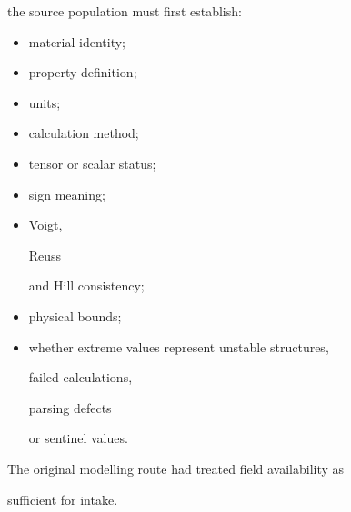 \documentclass[11pt,a4paper,oneside]{report}
\begin{document}
the source population must first establish:



\begin{itemize}



\item

material identity;



\item

property definition;



\item

units;



\item

calculation method;



\item

tensor or scalar status;



\item

sign meaning;



\item

Voigt,

Reuss

and Hill consistency;



\item

physical bounds;



\item

whether extreme values represent unstable structures,

failed calculations,

parsing defects

or sentinel values.



\end{itemize}



The original modelling route had treated field availability as

sufficient for intake.
\end{document}
